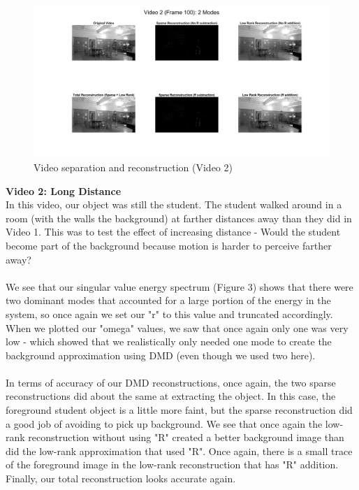 \documentclass{article}
\begin{document}
\begin{figure}[H]
\begin{center}
\includegraphics[width = 16cm]{vid2image}
\caption{\label{fig:scaled_diss} Video separation and reconstruction (Video 2)}
\end{center}
\end{figure}
\textbf{Video 2: Long Distance} \\
In this video, our object was still the student. The student walked around in a room (with the walls the background) at farther distances away than they did in Video 1. This was to test the effect of increasing distance - Would the student become part of the background because motion is harder to perceive farther away? \\ \\
We see that our singular value energy spectrum (Figure 3) shows that there were two dominant modes that accounted for a large portion of the energy in the system, so once again we set our "r" to this value and truncated accordingly. When we plotted our "omega" values, we saw that once again only one was very low - which showed that we realistically only needed one mode to create the background approximation using DMD (even though we used two here). \\ \\
In terms of accuracy of our DMD reconstructions, once again, the two sparse reconstructions did about the same at extracting the object. In this case, the foreground student object is a little more faint, but the sparse reconstruction did a good job of avoiding to pick up background. We see 
that once again the low-rank reconstruction without using "R" created a better background image than did the low-rank approximation that used "R". Once again, there is a small trace of the foreground image in the low-rank reconstruction that has "R" addition. Finally, our total reconstruction looks accurate again.
\end{document}

